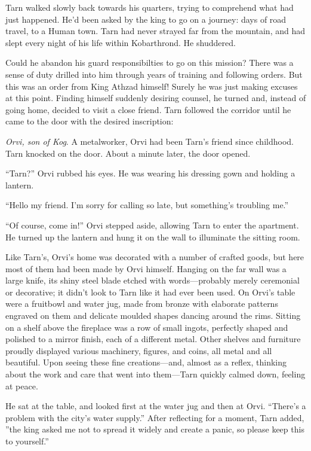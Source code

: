 
Tarn walked slowly back towards his quarters, trying to comprehend what had just happened.  He'd been asked by the king to go on a journey: days of road travel, to a Human town.  Tarn had never strayed far from the mountain, and had slept every night of his life within Kobarthrond.  He shuddered.

Could he abandon his guard responsibilties to go on this mission?  There was a sense of duty drilled into him through years of training and following orders.  But this was an order from King Athzad himself!  Surely he was just making excuses at this point.  Finding himself suddenly desiring counsel, he turned and, instead of going home, decided to visit a close friend.  Tarn followed the corridor until he came to the door with the desired inscription:


\emph{Orvi, son of Kog}.  A metalworker, Orvi had been Tarn's friend since childhood.  Tarn knocked on the door.  About a minute later, the door opened.

``Tarn?''  Orvi rubbed his eyes.  He was wearing his dressing gown and holding a lantern.

``Hello my friend.  I'm sorry for calling so late, but something's troubling me.''

``Of course, come in!''  Orvi stepped aside, allowing Tarn to enter the apartment.  He turned up the lantern and hung it on the wall to illuminate the sitting room.

Like Tarn's, Orvi's home was decorated with a number of crafted goods, but here most of them had been made by Orvi himself.  Hanging on the far wall was a large knife, its shiny steel blade etched with words---probably merely ceremonial or decorative; it didn't look to Tarn like it had ever been used.  On Orvi's table were a fruitbowl and water jug, made from bronze with elaborate patterns engraved on them and delicate moulded shapes dancing around the rims.   Sitting on a shelf above the fireplace was a row of small ingots, perfectly shaped and polished to a mirror finish, each of a different metal.  Other shelves and furniture proudly displayed various machinery, figures, and coins, all metal and all beautiful.  Upon seeing these fine creations---and, almost as a reflex, thinking about the work and care that went into them---Tarn quickly calmed down, feeling at peace.

He sat at the table, and looked first at the water jug and then at Orvi.  ``There's a problem with the city's water supply.''  After reflecting for a moment, Tarn added, ''the king asked me not to spread it widely and create a panic, so please keep this to yourself.''

